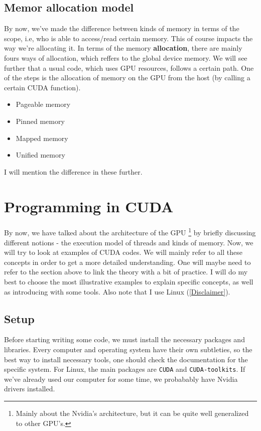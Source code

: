 \documentclass[12pt]{article}
\begin{document}
\subsection{Memor allocation model}
By now, we've made the difference between kinds of memory in terms of the scope, i.e, 
who is able to access/read certain memory. This of course impacts the way we're allocating it. 
In terms of the memory \textbf{allocation}, there are mainly fours ways of allocation, which reffers 
to the global device memory. 
We will see further that a usual 
code, which uses GPU resources, follows a certain path. One of the steps is the allocation of 
memory on the GPU from the host (by calling a certain CUDA function). 
\begin{itemize}
   \item Pageable memory
   \item Pinned memory
   \item Mapped memory
   \item Unified memory
\end{itemize}
I will mention the difference in these further.


\section{Programming in CUDA}

\paragraph{} By now, we have talked about the architecture of the GPU \footnote{Mainly about the Nvidia's architecture, but it 
can be quite well generalized to other GPU's.} by briefly discussing different notions - 
the execution model of threads and kinds of memory. Now, we will try to look at examples of CUDA codes. We will mainly refer to 
all these concepts in order to get a more detailed understanding. One will maybe need to refer to the section above 
to link the theory with a bit of practice. I will do my best to choose the most illustrative examples to explain specific concepts, 
as well as introducing with some tools. 
Also note that I use Linux (\autoref{Disclaimer}).

\subsection{Setup}
Before starting writing some code, we must install the necessary packages and libraries. Every computer and operating system 
have their own subtleties, so the best way to install necessary tools, one should check the documentation for the specific system.
For Linux, the main packages are \verb|CUDA| and \verb|CUDA-toolkits|. If we've already used our computer for some time,
we probabably have Nvidia drivers installed. 
\end{document}
